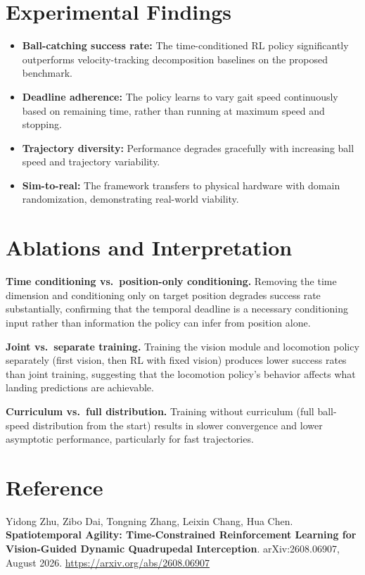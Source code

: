 \documentclass[10pt,twocolumn]{article}
\begin{document}
\section{Experimental Findings}

\begin{itemize}[itemsep=2pt,parsep=0pt]
  \item \textbf{Ball-catching success rate:} The time-conditioned RL policy
    significantly outperforms velocity-tracking decomposition baselines on
    the proposed benchmark.
  \item \textbf{Deadline adherence:} The policy learns to vary gait speed
    continuously based on remaining time, rather than running at maximum
    speed and stopping.
  \item \textbf{Trajectory diversity:} Performance degrades gracefully with
    increasing ball speed and trajectory variability.
  \item \textbf{Sim-to-real:} The framework transfers to physical hardware
    with domain randomization, demonstrating real-world viability.
\end{itemize}

\section{Ablations and Interpretation}

\textbf{Time conditioning vs.\ position-only conditioning.}
Removing the time dimension and conditioning only on target position degrades
success rate substantially, confirming that the temporal deadline is a necessary
conditioning input rather than information the policy can infer from position alone.

\textbf{Joint vs.\ separate training.}
Training the vision module and locomotion policy separately (first vision, then RL
with fixed vision) produces lower success rates than joint training, suggesting
that the locomotion policy's behavior affects what landing predictions are achievable.

\textbf{Curriculum vs.\ full distribution.}
Training without curriculum (full ball-speed distribution from the start) results
in slower convergence and lower asymptotic performance, particularly for fast
trajectories.

\section*{Reference}

Yidong Zhu, Zibo Dai, Tongning Zhang, Leixin Chang, Hua Chen.
\textbf{Spatiotemporal Agility: Time-Constrained Reinforcement Learning for
Vision-Guided Dynamic Quadrupedal Interception}.
arXiv:2608.06907, August 2026.
\url{https://arxiv.org/abs/2608.06907}
\end{document}
